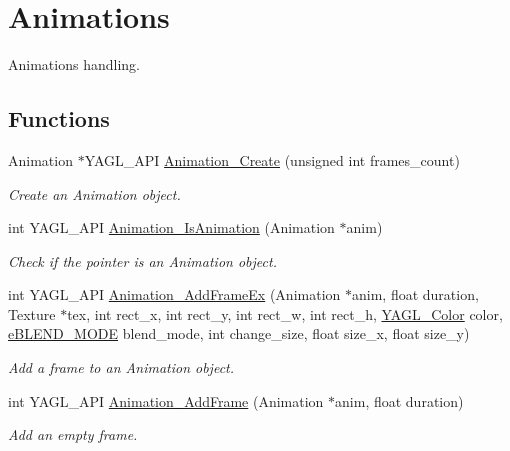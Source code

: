 \hypertarget{group____animation}{\section{Animations}
\label{group____animation}
}


Animations handling.  


\subsection*{Functions}
\begin{DoxyCompactItemize}
\item 
Animation $\ast$Y\-A\-G\-L\-\_\-\-A\-P\-I \hyperlink{group____animation_gaa6b1dc5a5f5806f988da1bae9f8681f0}{Animation\-\_\-\-Create} (unsigned int frames\-\_\-count)
\begin{DoxyCompactList}\small\item\em Create an Animation object. \end{DoxyCompactList}\item 
int Y\-A\-G\-L\-\_\-\-A\-P\-I \hyperlink{group____animation_ga50bcd7d47652ff0427217fdcbb9eb938}{Animation\-\_\-\-Is\-Animation} (Animation $\ast$anim)
\begin{DoxyCompactList}\small\item\em Check if the pointer is an Animation object. \end{DoxyCompactList}\item 
int Y\-A\-G\-L\-\_\-\-A\-P\-I \hyperlink{group____animation_gaa83f6f2b311c45480007ef18011e37d2}{Animation\-\_\-\-Add\-Frame\-Ex} (Animation $\ast$anim, float duration, Texture $\ast$tex, int rect\-\_\-x, int rect\-\_\-y, int rect\-\_\-w, int rect\-\_\-h, \hyperlink{group____consts__color_gafe1825ea3ea95c415448a35dc1f1418d}{Y\-A\-G\-L\-\_\-\-Color} color, \hyperlink{group____enums_ga332b9dbc3141f0555a6deea6cffed74a}{e\-B\-L\-E\-N\-D\-\_\-\-M\-O\-D\-E} blend\-\_\-mode, int change\-\_\-size, float size\-\_\-x, float size\-\_\-y)
\begin{DoxyCompactList}\small\item\em Add a frame to an Animation object. \end{DoxyCompactList}\item 
int Y\-A\-G\-L\-\_\-\-A\-P\-I \hyperlink{group____animation_ga7fef87c3fb18ab1f98e86514dbb24c73}{Animation\-\_\-\-Add\-Frame} (Animation $\ast$anim, float duration)
\begin{DoxyCompactList}\small\item\em Add an empty frame. \end{DoxyCompactList}\item 

\end{DoxyCompactItemize}
